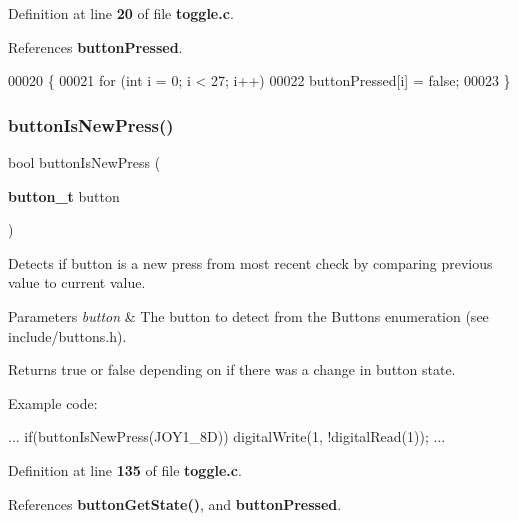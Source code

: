 Definition at line \textbf{ 20} of file \textbf{ toggle.\+c}.



References \textbf{ button\+Pressed}.


\begin{DoxyCode}
00020                   \{
00021     \textcolor{keywordflow}{for} (\textcolor{keywordtype}{int} i = 0; i < 27; i++)
00022         buttonPressed[i] = \textcolor{keyword}{false};
00023 \}
\end{DoxyCode}
\mbox{\label{toggle_8c_a07c56bf50097f5bf35c5e8c9067800e1}} 
\subsubsection{button\+Is\+New\+Press()}
{\footnotesize\ttfamily bool button\+Is\+New\+Press (\begin{DoxyParamCaption}\item[{\textbf{ button\+\_\+t}}]{button }\end{DoxyParamCaption})}



Detects if button is a new press from most recent check by comparing previous value to current value. 


\begin{DoxyParams}{Parameters}
{\em button} & The button to detect from the Buttons enumeration (see include/buttons.\+h).\\
\hline
\end{DoxyParams}
\begin{DoxyReturn}{Returns}
true or false depending on if there was a change in button state.
\end{DoxyReturn}
Example code\+: 
\begin{DoxyCode}
...
if(buttonIsNewPress(JOY1_8D))
    digitalWrite(1, !digitalRead(1));
...
\end{DoxyCode}
 

Definition at line \textbf{ 135} of file \textbf{ toggle.\+c}.



References \textbf{ button\+Get\+State()}, and \textbf{ button\+Pressed}.


